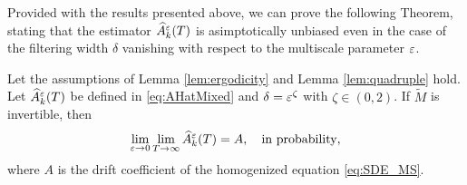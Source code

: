 \documentclass[10pt]{article}
\begin{document}
Provided with the results presented above, we can prove the following Theorem, stating that the estimator $\widehat A^\varepsilon_k(T)$ is asimptotically unbiased even in the case of the filtering width $\delta$ vanishing with respect to the multiscale parameter $\varepsilon$.

\begin{theorem}\label{thm:mainTheorem_zeta} Let the assumptions of Lemma \ref{lem:ergodicity} and Lemma \ref{lem:quadruple} hold. Let $\widehat A^\varepsilon_k(T)$ be defined in \eqref{eq:AHatMixed} and $\delta = \varepsilon^\zeta$ with $\zeta \in (0,2)$. If $\widetilde M$ is invertible, then
		\begin{equation}
		\lim_{\varepsilon \to 0} \lim_{T \to \infty} \widehat A_k^\varepsilon(T) = A, \quad \text{in probability},
		\end{equation}
		where $A$ is the drift coefficient of the homogenized equation \eqref{eq:SDE_MS}.
\end{theorem}
\end{document}
